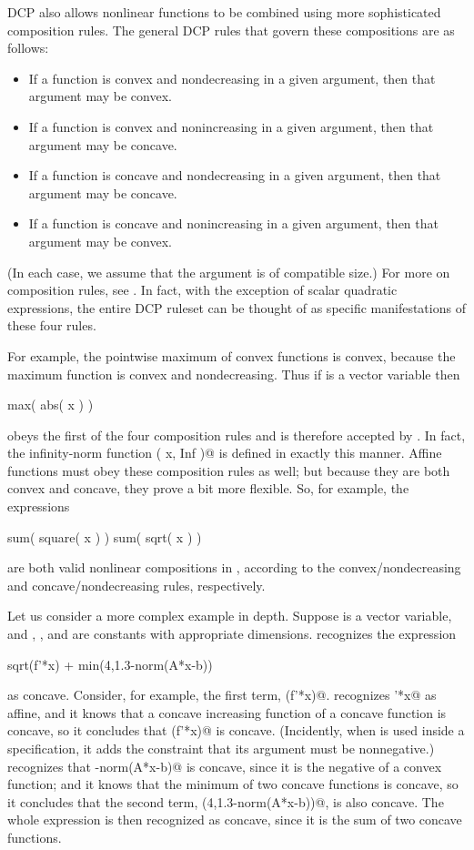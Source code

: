 \documentclass[12pt]{article}
\begin{document}
DCP also allows nonlinear functions to be combined using more
sophisticated composition rules. 
The general
DCP rules that govern these compositions are as follows:
\begin{itemize}
\item If a function is convex and nondecreasing in a given argument,
then that argument may be convex.
\item If a function is convex and nonincreasing in a given argument,
then that argument may be concave.
\item If a function is concave and nondecreasing in a given argument,
then that argument may be concave.
\item If a function is concave and nonincreasing in a given argument,
then that argument may be convex.
\end{itemize}
(In each case, we assume that the argument is of compatible size.)
For more on composition rules, see \cite[\S3.2.4]{BV:04}.
In fact, with the exception of scalar quadratic expressions,
the entire DCP ruleset can be thought of as specific manifestations
of these four rules.

For example, the pointwise maximum of convex functions is convex, because
the maximum function is convex and nondecreasing.
Thus if \verb@x@ is a vector variable then 
\begin{code}
	max( abs( x ) )
\end{code}
obeys the first of the four composition rules and is therefore accepted
by \cvx. In fact, the infinity-norm function \verb@norm( x, Inf )@
is defined in exactly this manner. 
Affine functions must obey these composition rules as well; but because they
are both convex and concave, they prove a bit more flexible. So, for example, 
the expressions
\begin{code}
	sum( square( x ) )
	sum( sqrt( x ) )
\end{code}
are both valid nonlinear compositions in \cvx, according to the 
convex/nondecreasing and concave/nondecreasing rules, respectively.

Let us consider a more complex example in depth. Suppose
\verb@x@ is a vector variable, and
\verb@A@, \verb@b@, and \verb@f@ are 
constants with appropriate dimensions.  \cvx recognizes the
expression
\begin{code}
sqrt(f'*x) + min(4,1.3-norm(A*x-b))
\end{code}
as concave. Consider, for example, the first term, \verb@sqrt(f'*x)@.
\cvx recognizes \verb@f'*x@ as affine, and it knows that a concave
increasing function of a concave function is concave, so it
concludes that \verb@sqrt(f'*x)@ is concave.
(Incidently, when \verb@sqrt@ is used inside a \cvx specification,
it adds the constraint that its argument must
be nonnegative.)
\cvx recognizes that \verb@-norm(A*x-b)@ is concave,
since it is the negative of a convex function;
and it knows that the minimum of two concave functions is concave,
so it concludes that the second term,  \verb@min(4,1.3-norm(A*x-b))@,
is also concave.  The whole expression is then recognized as concave,
since it is the sum of two concave functions.
\end{document}
